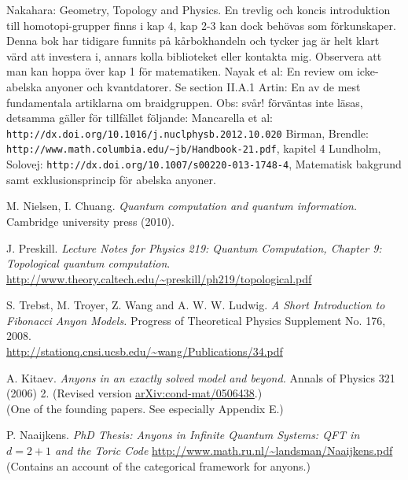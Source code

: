 \documentclass[a4paper,10pt,oneside]{book}
\theoremstyle{plain}
\theoremstyle{definition}
\theoremstyle{remark}
\begin{document}
\begin{thebibliography}{99}
   Nakahara: Geometry, Topology and Physics. En trevlig och koncis introduktion till homotopi-grupper finns i kap 4, kap 2-3 kan dock behövas som förkunskaper. Denna bok har tidigare funnits på kårbokhandeln och tycker jag är helt klart värd att investera i, annars kolla biblioteket eller kontakta mig. Observera att man kan hoppa över kap 1 för matematiken.
   Nayak et al: En review om icke-abelska anyoner och kvantdatorer. Se section II.A.1
   Artin: En av de mest fundamentala artiklarna om braidgruppen. Obs: svår! förväntas inte läsas, detsamma gäller för tillfället följande:
   Mancarella et al: \verb|http://dx.doi.org/10.1016/j.nuclphysb.2012.10.020|
   Birman, Brendle: \verb|http://www.math.columbia.edu/~jb/Handbook-21.pdf|, kapitel 4
   Lundholm, Solovej: \verb|http://dx.doi.org/10.1007/s00220-013-1748-4|, Matematisk bakgrund samt exklusionsprincip för abelska anyoner.

    M. Nielsen, I. Chuang.
    \textit{Quantum computation and quantum information.}
    Cambridge university press (2010).

    J. Preskill.
    \textit{Lecture Notes for Physics 219: Quantum Computation, Chapter 9: Topological quantum computation}.
    \\
    \url{http://www.theory.caltech.edu/~preskill/ph219/topological.pdf}

    S. Trebst, M. Troyer, Z. Wang and A. W. W. Ludwig.
    \textit{A Short Introduction to Fibonacci Anyon Models.}
    Progress of Theoretical Physics Supplement No. 176, 2008.
    \\
    \url{http://stationq.cnsi.ucsb.edu/~wang/Publications/34.pdf}

    A. Kitaev.
    \textit{Anyons in an exactly solved model and beyond.}
    Annals of Physics 321 (2006) 2.
    (Revised version \href{https://arxiv.org/abs/cond-mat/0506438}{arXiv:cond-mat/0506438}.)
    \\\relax
    (One of the founding papers. See especially Appendix E.)

    P. Naaijkens.
    \textit{PhD Thesis: Anyons in Infinite Quantum Systems: QFT in $d=2+1$ and the Toric Code}
    \url{http://www.math.ru.nl/~landsman/Naaijkens.pdf}
    \\\relax
    (Contains an account of the categorical framework for anyons.)


\end{thebibliography}
\end{document}
